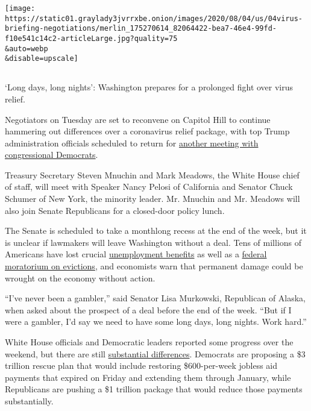 \texttt{[image: https://static01.graylady3jvrrxbe.onion/images/2020/08/04/us/04virus-briefing-negotiations/merlin\_175270614\_82064422-bea7-46e4-99fd-f10e541c14c2-articleLarge.jpg?quality=75\\\&auto=webp\\\&disable=upscale]}

\subsection{}

`Long days, long nights': Washington prepares for a prolonged fight over
virus relief.

Negotiators on Tuesday are set to reconvene on Capitol Hill to continue
hammering out differences over a coronavirus relief package, with top
Trump administration officials scheduled to return for
\href{https://www.nytimes3xbfgragh.onion/2020/08/02/us/politics/coronavirus-jobless-aid.html}{another
meeting with congressional Democrats}.

Treasury Secretary Steven Mnuchin and Mark Meadows, the White House
chief of staff, will meet with Speaker Nancy Pelosi of California and
Senator Chuck Schumer of New York, the minority leader. Mr. Mnuchin and
Mr. Meadows will also join Senate Republicans for a closed-door policy
lunch.

The Senate is scheduled to take a monthlong recess at the end of the
week, but it is unclear if lawmakers will leave Washington without a
deal. Tens of millions of Americans have lost crucial
\href{https://www.nytimes3xbfgragh.onion/2020/07/30/business/unemployment-payments-change.html}{unemployment
benefits} as well as a
\href{https://www.nytimes3xbfgragh.onion/2020/07/23/business/evictions-moratorium-cares-act.html}{federal
moratorium on evictions}, and economists warn that permanent damage
could be wrought on the economy without action.

``I've never been a gambler,'' said Senator Lisa Murkowski, Republican
of Alaska, when asked about the prospect of a deal before the end of the
week. ``But if I were a gambler, I'd say we need to have some long days,
long nights. Work hard.''

White House officials and Democratic leaders reported some progress over
the weekend, but there are still
\href{https://www.nytimes3xbfgragh.onion/2020/08/02/us/politics/coronavirus-jobless-aid.html}{substantial
differences}. Democrats are proposing a \$3 trillion rescue plan that
would include restoring \$600-per-week jobless aid payments that expired
on Friday and extending them through January, while Republicans are
pushing a \$1 trillion package that would reduce those payments
substantially.

